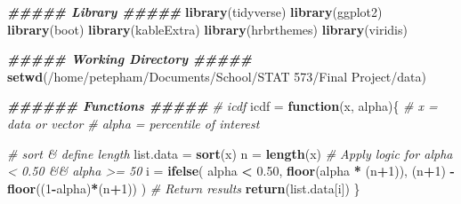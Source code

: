 \documentclass[
]{article}
\newenvironment{Shaded}{\begin{snugshade}}{\end{snugshade}}
\newcommand{\CommentTok}[1]{\textcolor[rgb]{0.56,0.35,0.01}{\textit{#1}}}
\newcommand{\ControlFlowTok}[1]{\textcolor[rgb]{0.13,0.29,0.53}{\textbf{#1}}}
\newcommand{\DecValTok}[1]{\textcolor[rgb]{0.00,0.00,0.81}{#1}}
\newcommand{\DocumentationTok}[1]{\textcolor[rgb]{0.56,0.35,0.01}{\textbf{\textit{#1}}}}
\newcommand{\FloatTok}[1]{\textcolor[rgb]{0.00,0.00,0.81}{#1}}
\newcommand{\FunctionTok}[1]{\textcolor[rgb]{0.13,0.29,0.53}{\textbf{#1}}}
\newcommand{\NormalTok}[1]{#1}
\newcommand{\OtherTok}[1]{\textcolor[rgb]{0.56,0.35,0.01}{#1}}
\newcommand{\SpecialCharTok}[1]{\textcolor[rgb]{0.81,0.36,0.00}{\textbf{#1}}}
\newcommand{\StringTok}[1]{\textcolor[rgb]{0.31,0.60,0.02}{#1}}
\begin{document}
\begin{Shaded}
\begin{Highlighting}[]
\DocumentationTok{\#\#\#\#\# Library \#\#\#\#\#}
\FunctionTok{library}\NormalTok{(tidyverse)}
\FunctionTok{library}\NormalTok{(ggplot2)}
\FunctionTok{library}\NormalTok{(boot)}
\FunctionTok{library}\NormalTok{(kableExtra)}
\FunctionTok{library}\NormalTok{(hrbrthemes)}
\FunctionTok{library}\NormalTok{(viridis)}

\DocumentationTok{\#\#\#\#\# Working Directory \#\#\#\#\#}
\FunctionTok{setwd}\NormalTok{(}\StringTok{\textquotesingle{}/home/petepham/Documents/School/STAT 573/Final Project/data\textquotesingle{}}\NormalTok{)}

\DocumentationTok{\#\#\#\#\#\# Functions \#\#\#\#\#}
\CommentTok{\# icdf}
\NormalTok{icdf }\OtherTok{=} \ControlFlowTok{function}\NormalTok{(x, alpha)\{}
    \CommentTok{\# x = data or vector}
    \CommentTok{\# alpha = percentile of interest}

    \CommentTok{\# sort \& define length}
\NormalTok{    list.data }\OtherTok{=} \FunctionTok{sort}\NormalTok{(x)}
\NormalTok{    n }\OtherTok{=} \FunctionTok{length}\NormalTok{(x)}
    \CommentTok{\# Apply logic for alpha \textless{} 0.50 \&\& alpha \textgreater{}= 50}
\NormalTok{    i }\OtherTok{=} \FunctionTok{ifelse}\NormalTok{(}
\NormalTok{        alpha }\SpecialCharTok{\textless{}} \FloatTok{0.50}\NormalTok{,}
        \FunctionTok{floor}\NormalTok{(alpha }\SpecialCharTok{*}\NormalTok{ (n}\SpecialCharTok{+}\DecValTok{1}\NormalTok{)),}
\NormalTok{        (n}\SpecialCharTok{+}\DecValTok{1}\NormalTok{) }\SpecialCharTok{{-}} \FunctionTok{floor}\NormalTok{((}\DecValTok{1}\SpecialCharTok{{-}}\NormalTok{alpha)}\SpecialCharTok{*}\NormalTok{(n}\SpecialCharTok{+}\DecValTok{1}\NormalTok{))}
\NormalTok{    )}
    \CommentTok{\# Return results}
    \FunctionTok{return}\NormalTok{(list.data[i])}
\NormalTok{\}}


\end{Highlighting}
\end{Shaded}
\end{document}
